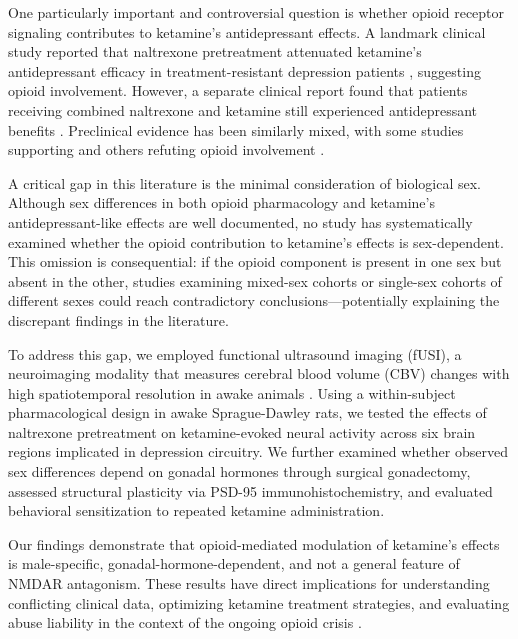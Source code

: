 \documentclass[11pt]{article}
\begin{document}
One particularly important and controversial question is whether opioid receptor signaling contributes to ketamine's antidepressant effects. A landmark clinical study reported that naltrexone pretreatment attenuated ketamine's antidepressant efficacy in treatment-resistant depression patients \citep{williams2018attenuation}, suggesting opioid involvement. However, a separate clinical report found that patients receiving combined naltrexone and ketamine still experienced antidepressant benefits \citep{yoon2019association}. Preclinical evidence has been similarly mixed, with some studies supporting and others refuting opioid involvement \citep{marton2019roles, maciel2018dose}.

A critical gap in this literature is the minimal consideration of biological sex. Although sex differences in both opioid pharmacology \citep{craft2003sex} and ketamine's antidepressant-like effects \citep{carrier2015sex, franceschelli2015sex} are well documented, no study has systematically examined whether the opioid contribution to ketamine's effects is sex-dependent. This omission is consequential: if the opioid component is present in one sex but absent in the other, studies examining mixed-sex cohorts or single-sex cohorts of different sexes could reach contradictory conclusions---potentially explaining the discrepant findings in the literature.

To address this gap, we employed functional ultrasound imaging (fUSI), a neuroimaging modality that measures cerebral blood volume (CBV) changes with high spatiotemporal resolution in awake animals \citep{mace2011functional, deffieux2018functional, urban2015functional}. Using a within-subject pharmacological design in awake Sprague-Dawley rats, we tested the effects of naltrexone pretreatment on ketamine-evoked neural activity across six brain regions implicated in depression circuitry. We further examined whether observed sex differences depend on gonadal hormones through surgical gonadectomy, assessed structural plasticity via PSD-95 immunohistochemistry, and evaluated behavioral sensitization to repeated ketamine administration.

Our findings demonstrate that opioid-mediated modulation of ketamine's effects is male-specific, gonadal-hormone-dependent, and not a general feature of NMDAR antagonism. These results have direct implications for understanding conflicting clinical data, optimizing ketamine treatment strategies, and evaluating abuse liability in the context of the ongoing opioid crisis \citep{ketamine_abuse_liability2020}.
\end{document}
